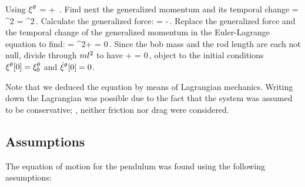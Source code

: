 Using ${\xi}^{\theta}$ %
\beq
\lag = \mass\igvel\theta\igvel\theta + \mass\grav\length\cos\vat{\igpos\theta}\,.
\eeq
Find next the generalized momentum and its temporal change
\beq
\ipd{\igvel\theta}{\lag} = \mass\length^2\igvel\theta\implies
{}\ipd{\igvel\theta}{\lag} = \mass\length^2\igacc\theta\,.
\eeq
Calculate the generalized force:
\beq
\ipd{\igpos\theta}{\lag} = -\mass\grav\length\sin\vat{\igpos\theta}\,.
\eeq
Replace the generalized force and the temporal change of the generalized momentum in the Euler-Lagrange equation to find:
\beq
\elop{\igpos\theta}{\igvel\theta}\lag = \mass\length^2\igacc\theta + \mass\grav\length\sin\vat{\igpos\theta} = 0\,.
\eeq
Since the bob mass and the rod length are each not null, divide through $ml^2$ to have
\beq
\igacc\theta + \dfrac{\grav}{\length}\sin\vat{\igpos\theta} = 0\,,
\eeq
object to the initial conditions ${\xi}^{\theta}\!\left[{0}\right] = {\xi}^{\theta}_0$ and ${\dot{\xi}}^{\theta}\!\left[{0}\right] = 0$.

Note that we deduced the equation by means of Lagrangian mechanics. Writing down the Lagrangian was possible due to the fact that the system was assumed to be conservative; \ie, neither friction nor drag were considered.


\subsection{Assumptions}
The equation of motion for the pendulum was found using the following assumptions:
